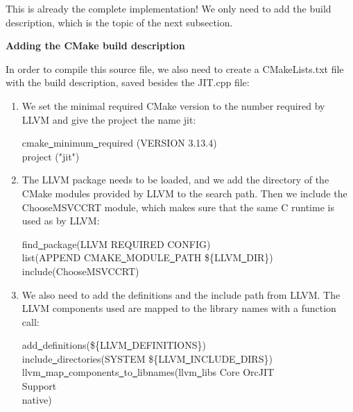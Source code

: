 This is already the complete implementation! We only need to add the build description, which is the topic of the next subsection. \par

\hspace*{\fill} \par %
\textbf{Adding the CMake build description}

In order to compile this source file, we also need to create a CMakeLists.txt file with the build description, saved besides the JIT.cpp file:\par

\begin{enumerate}
\item We set the minimal required CMake version to the number required by LLVM and 
give the project the name jit:
\begin{tcolorbox}[colback=white,colframe=black]
cmake\underline{~}minimum\underline{~}required (VERSION 3.13.4) \\
project ("jit")
\end{tcolorbox}

\item The LLVM package needs to be loaded, and we add the directory of the CMake modules provided by LLVM to the search path. Then we include the ChooseMSVCCRT module, which makes sure that the same C runtime is used as by LLVM:
\begin{tcolorbox}[colback=white,colframe=black]
find\underline{~}package(LLVM REQUIRED CONFIG) \\
list(APPEND CMAKE\underline{~}MODULE\underline{~}PATH \$\{LLVM\underline{~}DIR\}) \\
include(ChooseMSVCCRT)
\end{tcolorbox}

\item We also need to add the definitions and the include path from LLVM. The LLVM components used are mapped to the library names with a function call:
\begin{tcolorbox}[colback=white,colframe=black]
add\underline{~}definitions(\$\{LLVM\underline{~}DEFINITIONS\}) \\
include\underline{~}directories(SYSTEM \$\{LLVM\underline{~}INCLUDE\underline{~}DIRS\}) \\
llvm\underline{~}map\underline{~}components\underline{~}to\underline{~}libnames(llvm\underline{~}libs Core OrcJIT \\
\hspace*{6cm}Support  \\
\hspace*{6cm}native)
\end{tcolorbox}


\end{enumerate}
